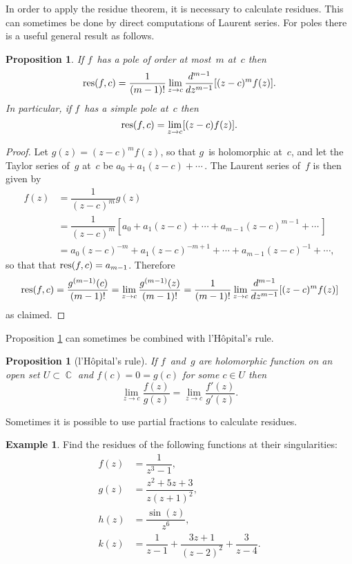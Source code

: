 \documentclass{amsproc}
\newtheorem{proposition}[theorem]{Proposition}
\theoremstyle{definition}
\newtheorem{example}[theorem]{Example}
\theoremstyle{remark}
\DeclareMathOperator{\C}{\mathbb{C}}
\DeclareMathOperator{\res}{\textup{res}}
\numberwithin{equation}{section}
\begin{document}
In order to apply the residue theorem, it is necessary to calculate residues. This can sometimes be done by direct computations of Laurent series. For poles there is a useful
general result as follows.

\begin{proposition} \label{CMP12.3}
If $ f $~has a pole of order at most~$ m $ at~$ c $ then
$$
\res(f,c) = \dfrac{1}{(m - 1)!} \lim_{z \to c} \dfrac{d^{m - 1}}{dz^{m - 1}}[(z - c)^m f(z)].
$$
In particular, if $ f $~has a simple pole at~$ c $ then
$$
\res(f,c) = \lim_{z \to c}[(z - c)f(z)].
$$
\end{proposition}

\begin{proof}
Let $ g(z) = (z - c)^m f(z) $, so that $ g $~is holomorphic at~$ c $, and let the Taylor series of~$ g $ at~$ c $ be $ a_0 + a_1(z - c) + \cdots\, $. The Laurent series of~$ f $
is then given by
\begin{align*}
f(z) &= \dfrac{1}{(z - c)^m}g(z) \\
&= \dfrac{1}{(z - c)^m}[a_0 + a_1(z - c) + \cdots + a_{m - 1}(z - c)^{m - 1} + \cdots\,] \\
&= a_0(z - c)^{-m} + a_1(z - c)^{-m + 1} + \cdots + a_{m - 1}(z - c)^{-1} + \cdots,
\end{align*}
so that that $ \res(f,c) = a_{m - 1} $. Therefore
$$
\res(f,c) = \dfrac{g^{(m - 1)}(c)}{(m - 1)!} = \lim_{z \to c} \dfrac{g^{(m - 1)}(z)}{(m - 1)!}
= \dfrac{1}{(m - 1)!} \lim_{z \to c} \dfrac{d^{m - 1}}{dz^{m - 1}}[(z - c)^m f(z)]
$$
as claimed.
\end{proof}

Proposition \ref{CMP12.3} can sometimes be combined with l'H\^opital's rule.

\begin{proposition}[l'H\^opital's rule] \label{CMP12.4}
If $ f $~and~$ g $ are holomorphic function on an open set $ U \subset \C $ and $ f(c) = 0 = g(c) $ for some $ c \in U $ then
$$
\lim_{z \to c} \dfrac{f(z)}{g(z)} = \lim_{z \to c} \dfrac{f'(z)}{g'(z)}.
$$
\end{proposition}

Sometimes it is possible to use partial fractions to calculate residues.

\begin{example} \label{CME12.5}
Find the residues of the following functions at their singularities:
\begin{align*}
f(z) &= \dfrac{1}{z^3 - 1}, \\
g(z) &= \dfrac{z^2 + 5z + 3}{z(z + 1)^2}, \\
h(z) &= \dfrac{\sin(z)}{z^6}, \\
k(z) &= \dfrac{1}{z - 1} + \dfrac{3z + 1}{(z - 2)^2} + \dfrac{3}{z - 4}.
\end{align*}
\end{example}
\end{document}
